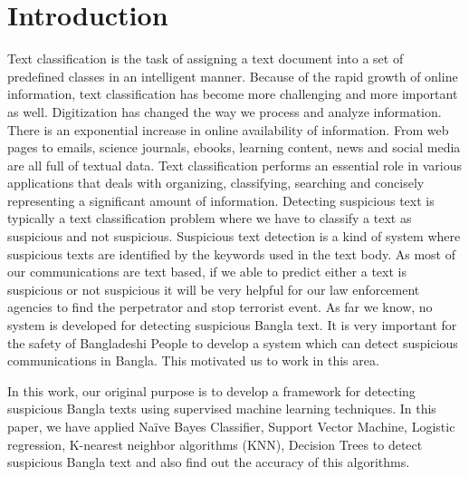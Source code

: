 \section{\textbf{Introduction}}
Text classification is the task of assigning a text document into a set of predefined classes in an intelligent manner. Because of the rapid growth of online information, text classification has become more challenging and more important as well. Digitization has changed
the way we process and analyze information. There is an exponential increase in online availability of information. From web pages to emails, science journals, ebooks, learning content, news and social media are all full of textual data. Text classification performs an essential role in various applications that deals with organizing, classifying, searching and concisely representing a significant amount of information. Detecting suspicious text is typically a text classification problem where we have to classify a text as suspicious and not suspicious. Suspicious text detection is a kind of system where suspicious texts are identified by the keywords used in the text body. As most of our communications are text based, if we able to predict either a text is suspicious or not suspicious it will be very helpful for our law enforcement agencies to find the perpetrator and stop terrorist event. As far we know, no system is developed for detecting suspicious Bangla text. It is very important for the safety of Bangladeshi People to develop a system which can detect suspicious communications in Bangla. This motivated us to work in this area.

In this work, our original purpose is to develop a framework for detecting suspicious Bangla texts using supervised machine learning techniques. In this paper, we have applied Naïve Bayes Classifier\cite{yoo2015classification}, Support Vector Machine\cite{wei2012text, villmann2017can}, Logistic regression\cite{sharma2015active}, K-nearest neighbor algorithms (KNN)\cite{harisinghaney2014text}, Decision Trees\cite{chavan2014survey} to detect suspicious Bangla text and also find out the accuracy of this algorithms.